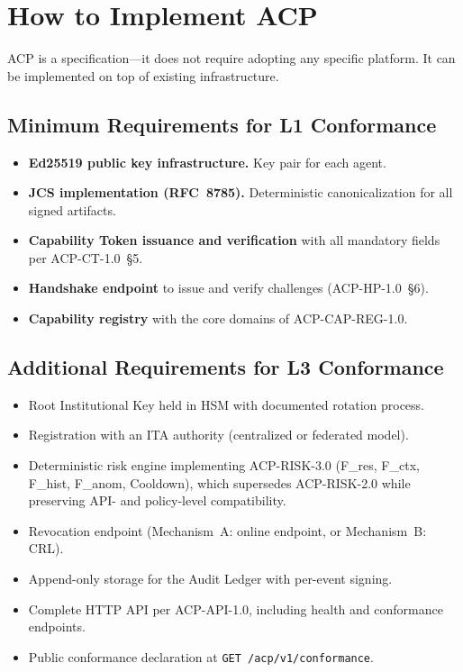 \documentclass[11pt]{article}
\theoremstyle{definition}
\begin{document}
\section{How to Implement ACP}

ACP is a specification---it does not require adopting any specific platform.
It can be implemented on top of existing infrastructure.

\subsection{Minimum Requirements for L1 Conformance}

\begin{itemize}[noitemsep]
  \item \textbf{Ed25519 public key infrastructure.} Key pair for each agent.
  \item \textbf{JCS implementation (RFC~8785).} Deterministic canonicalization for all signed artifacts.
  \item \textbf{Capability Token issuance and verification} with all mandatory fields per ACP-CT-1.0~\S5.
  \item \textbf{Handshake endpoint} to issue and verify challenges (ACP-HP-1.0~\S6).
  \item \textbf{Capability registry} with the core domains of ACP-CAP-REG-1.0.
\end{itemize}

\subsection{Additional Requirements for L3 Conformance}

\begin{itemize}[noitemsep]
  \item Root Institutional Key held in HSM with documented rotation process.
  \item Registration with an ITA authority (centralized or federated model).
  \item Deterministic risk engine implementing ACP-RISK-3.0 (F\_res, F\_ctx, F\_hist, F\_anom, Cooldown),
    which supersedes ACP-RISK-2.0 while preserving API- and policy-level compatibility.
  \item Revocation endpoint (Mechanism~A: online endpoint, or Mechanism~B: CRL).
  \item Append-only storage for the Audit Ledger with per-event signing.
  \item Complete HTTP API per ACP-API-1.0, including health and conformance endpoints.
  \item Public conformance declaration at \texttt{GET /acp/v1/conformance}.
\end{itemize}
\end{document}

